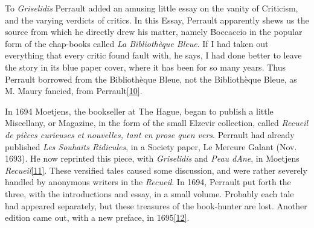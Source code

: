 \documentclass[14pt,a4paper]{memoir}
\begin{document}
To \emph{Griselidis} Perrault added an amusing little essay on the
vanity of Criticism, and the varying verdicts of critics. In this Essay,
Perrault apparently shews us the source from which he directly drew his
matter, namely Boccaccio in the popular form of the chap-books called
\emph{La Bibliothèque Bleue}. \textquotesingle If I had taken out
everything that every critic found fault with,\textquotesingle{} he
says, \textquotesingle I had done better to leave the story in its blue
paper cover, where it has been for so many years.\textquotesingle{} Thus
Perrault borrowed from the Bibliothèque Bleue, not the Bibliothèque
Bleue, as M. Maury fancied, from
Perrault\protect\hypertarget{4533318093929944247_33931-h-0.htm.xhtmlux5cux23FNanchor_10}{}{}\protect\hyperlink{4533318093929944247_33931-h-0.htm.xhtmlux5cux23Footnote_10}{{[}10{]}}.

In 1694 Moetjens, the bookseller at The Hague, began to publish a little
Miscellany, or Magazine, in the form of the small Elzevir collection,
called \emph{Recueil de pièces curieuses et nouvelles, tant en prose
qu\textquotesingle en vers}. Perrault had already published \emph{Les
Souhaits Ridicules}, in a Society paper, Le Mercure Galant (Nov. 1693).
He now reprinted this piece, with \emph{Griselidis} and \emph{Peau
d\textquotesingle Ane}, in Moetjens\textquotesingle{}
\emph{Recueil}\protect\hypertarget{4533318093929944247_33931-h-0.htm.xhtmlux5cux23FNanchor_11}{}{}\protect\hyperlink{4533318093929944247_33931-h-0.htm.xhtmlux5cux23Footnote_11}{{[}11{]}}.
These versified tales caused some discussion, and were rather severely
handled by anonymous writers in the \emph{Recueil}. In 1694, Perrault
put forth the three, with the introductions and essay, in a small
volume. Probably each tale had appeared separately, but these treasures
of the book-hunter are lost. Another edition came out, with a new
preface, in
1695\protect\hypertarget{4533318093929944247_33931-h-0.htm.xhtmlux5cux23FNanchor_12}{}{}\protect\hyperlink{4533318093929944247_33931-h-0.htm.xhtmlux5cux23Footnote_12}{{[}12{]}}.
\end{document}
